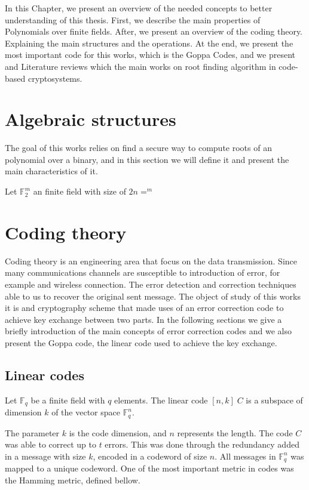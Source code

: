 In this Chapter, we present an overview of the needed concepts to better understanding of this thesis. First, we describe the main properties of Polynomials over finite fields. After, we present an overview of the coding theory. Explaining the main structures and the operations. At the end, we present the most important code for this works, which is the Goppa Codes, and we present and Literature reviews which the main works on root finding algorithm in code-based cryptosystems. 

\section{Algebraic structures}
The goal of this works relies on find a secure way to compute roots of an polynomial over a binary, and in this section we will define it and present the main characteristics of it.

\begin{definition}
Let $\mathbb{F}_{2}^{m}$ an finite field with size of $2n=^m$
\end{definition}

\section{Coding theory}
Coding theory is an engineering area that focus on the data transmission. Since many communications channels are susceptible to introduction of error, for example and wireless connection. The error detection and correction techniques able to us to recover the original sent message. The object of study of this works it is and cryptography scheme that made uses of an error correction code to achieve key exchange between two parts. In the following sections we give a briefly introduction of the main concepts of error correction codes and we also present the Goppa code, the linear code used to achieve the key exchange.


\subsection{Linear codes}
\begin{definition}
Let $\mathbb{F}_{q}$ be a finite field with $q$ elements. The linear code $[n, k]\;C$ is a subspace of dimension $k$ of the vector space $\mathbb{F}_{q}^n$.
\end{definition}

The parameter $k$ is the code dimension, and $n$ represents the length. The code $C$ was able to correct up to $t$ errors. This was done through the redundancy added in a message with size $k$, encoded in a codeword of size $n$. All messages in $\mathbb{F}_{q}^n$ was mapped to a unique codeword. One of the most important metric in codes was the Hamming metric, defined bellow.

